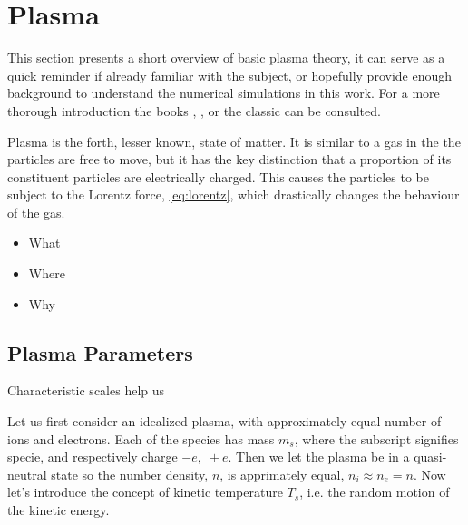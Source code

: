 \section{Plasma}
	\label{sec:plasma}
	This section presents a short overview of basic plasma theory, it can serve as a
	quick reminder if already familiar with the subject, or hopefully provide enough
	background to understand the numerical simulations in this work.
	For a more thorough introduction the books \textit{}
    \citep{fitzpatrick_plasma_2014}, \textit{} \citep{goldston_introduction_1995},
    \textit{} \citep{pecseli_waves_2012} or the classic
    \textit{} \citep{chen_introduction_1984} can be consulted.

	Plasma is the forth, lesser known, state of matter. It is similar to a gas
	in the the particles are free to move, but it has the key distinction that
	a proportion of its constituent particles are electrically charged. This
	causes the particles to be subject to the Lorentz force, \cref{eq:lorentz}, which drastically
	changes the behaviour of the gas.

    \begin{itemize}
        \item What
        \item Where
        \item Why
    \end{itemize}

    \subsection{Plasma Parameters}
		\label{sec:parameters}
		Characteristic scales help us

        Let us first consider an idealized plasma, with approximately equal number
        of ions and electrons. Each of the species has mass \(m_s\), where the
        subscript signifies specie, and respectively charge \(-e, \; +e\). Then we let the plasma be in a quasi-neutral state
        so the number density, \(n\), is apprimately equal, \(n_i\approx n_e = n\).
        Now let's introduce the concept of kinetic temperature \(T_s\), i.e. the random
        motion of the kinetic energy.

